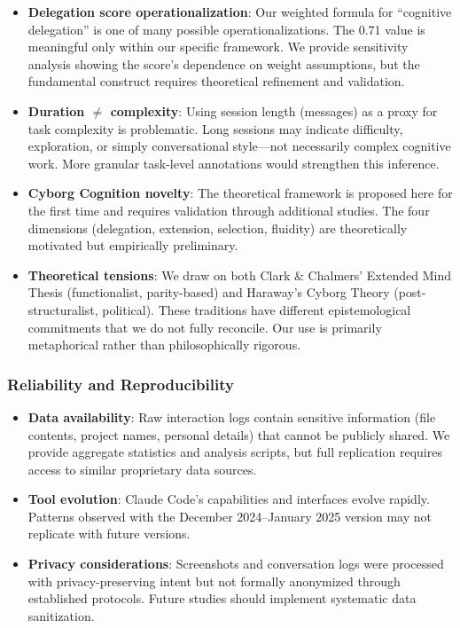 \begin{itemize}
    \item \textbf{Delegation score operationalization}: Our weighted formula for ``cognitive delegation'' is one of many possible operationalizations. The 0.71 value is meaningful only within our specific framework. We provide sensitivity analysis showing the score's dependence on weight assumptions, but the fundamental construct requires theoretical refinement and validation.

    \item \textbf{Duration $\neq$ complexity}: Using session length (messages) as a proxy for task complexity is problematic. Long sessions may indicate difficulty, exploration, or simply conversational style---not necessarily complex cognitive work. More granular task-level annotations would strengthen this inference.

    \item \textbf{Cyborg Cognition novelty}: The theoretical framework is proposed here for the first time and requires validation through additional studies. The four dimensions (delegation, extension, selection, fluidity) are theoretically motivated but empirically preliminary.

    \item \textbf{Theoretical tensions}: We draw on both Clark \& Chalmers' Extended Mind Thesis (functionalist, parity-based) and Haraway's Cyborg Theory (post-structuralist, political). These traditions have different epistemological commitments that we do not fully reconcile. Our use is primarily metaphorical rather than philosophically rigorous.
\end{itemize}

\subsubsection{Reliability and Reproducibility}

\begin{itemize}
    \item \textbf{Data availability}: Raw interaction logs contain sensitive information (file contents, project names, personal details) that cannot be publicly shared. We provide aggregate statistics and analysis scripts, but full replication requires access to similar proprietary data sources.

    \item \textbf{Tool evolution}: Claude Code's capabilities and interfaces evolve rapidly. Patterns observed with the December 2024--January 2025 version may not replicate with future versions.

    \item \textbf{Privacy considerations}: Screenshots and conversation logs were processed with privacy-preserving intent but not formally anonymized through established protocols. Future studies should implement systematic data sanitization.
\end{itemize}

